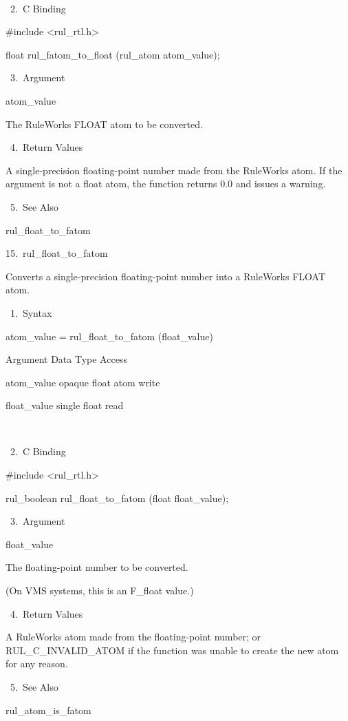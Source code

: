            

       2. C Binding

          #include <rul_rtl.h>

          float rul_fatom_to_float (rul_atom
          atom_value);

       3. Argument

          atom_value

          The RuleWorks FLOAT atom to be
          converted.

       4. Return Values

          A single-precision floating-point
          number made from the RuleWorks atom.
          If the argument is not a float atom,
          the function returns 0.0 and issues
          a warning.

       5. See Also

    rul_float_to_fatom

15. rul_float_to_fatom

    Converts a single-precision floating-point
    number into a RuleWorks FLOAT atom.

       1. Syntax

          atom_value = rul_float_to_fatom
          (float_value)

          Argument  Data Type    Access

          atom_value  opaque float atom
            write

          float_value  single float   read

           

       2. C Binding

          #include <rul_rtl.h>

          rul_boolean rul_float_to_fatom
          (float float_value);

       3. Argument

          float_value

          The floating-point number to be
          converted.

          (On VMS systems, this is an F_float
          value.)

       4. Return Values

          A RuleWorks atom made from the
          floating-point number; or
          RUL_C_INVALID_ATOM if the function
          was unable to create the new atom
          for any reason.

       5. See Also

    rul_atom_is_fatom

